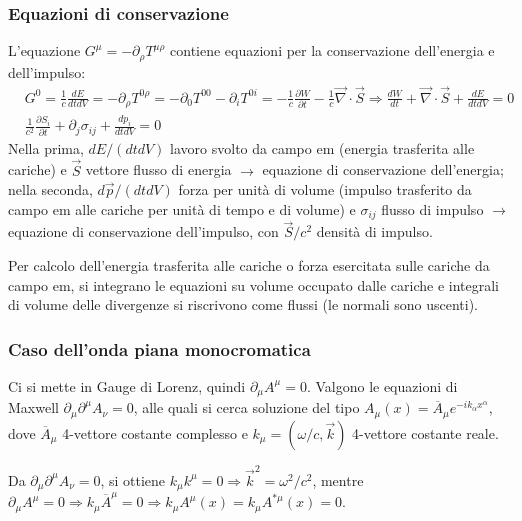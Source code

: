 \documentclass[10pt, a4paper]{scrartcl}
\numberwithin{equation}{subsection}
\theoremstyle{style1}
\begin{document}
\subsubsection{Equazioni di conservazione}
L'equazione $G^\mu  = - \partial _\rho T^{\mu \rho } $ contiene equazioni per la conservazione dell'energia e dell'impulso:
\begin{equation*}
	\begin{split}
		&G^0=\frac{1}{c}\frac{d E}{d t dV} = - \partial _\rho T^{0\rho } = - \partial _0 T^{00} - \partial _i T^{0i}= -\frac{1}{c}\frac{\partial W}{\partial t} - \frac{1}{c}\vec{\nabla }\cdot \vec{S}\Rightarrow  \frac{d W}{d t} + \vec{\nabla }\cdot \vec{S} + \frac{d E}{d t dV} =0\\
		& \frac{1}{c^2}\frac{\partial S_i}{\partial t} + \partial _j \sigma _{ij} + \frac{d p_i}{d t d V}  = 0
	\end{split}
\end{equation*}
Nella prima, $dE / (dt dV)$ lavoro svolto da campo em (energia trasferita alle cariche) e $\vec{S}$ vettore flusso di energia $\to$ equazione di conservazione dell'energia; nella seconda, $d\vec{p}/(dt dV)$ forza per unit\`a di volume (impulso trasferito da campo em alle cariche per unit\`a di tempo e di volume) e $\sigma _{ij} $ flusso di impulso $\to $ equazione di conservazione dell'impulso, con $\vec{S}/ c^2 $ densit\`a di impulso.

Per calcolo dell'energia trasferita alle cariche o forza esercitata sulle cariche da campo em, si integrano le equazioni su volume occupato dalle cariche e integrali di volume delle divergenze si riscrivono come flussi (le normali sono uscenti).

\subsubsection{Caso dell'onda piana monocromatica}

Ci si mette in Gauge di Lorenz, quindi $\partial _\mu  A^\mu  =0 $. Valgono le equazioni di Maxwell $\partial _\mu \partial ^\mu  A_\nu  =0 $, alle quali si cerca soluzione del tipo $A_\mu (x) = \overline{A}_\mu  e^{-ik_\alpha  x^\alpha } $, dove $\overline{A}_\mu $ 4-vettore costante complesso e $k_\mu =(\omega / c, \vec{k}) $ 4-vettore costante reale.

Da $\partial _\mu  \partial ^\mu  A_\nu =0$, si ottiene $k_\mu k^\mu  =0 \Rightarrow \vec{k}^2 = \omega^2 / c^2$, mentre $\partial _\mu  A^\mu =0\Rightarrow k_\mu \overline{A}^\mu  =0 \Rightarrow k_\mu A^\mu (x) = k_\mu A^{*\mu}(x)=0 $.
\end{document}
